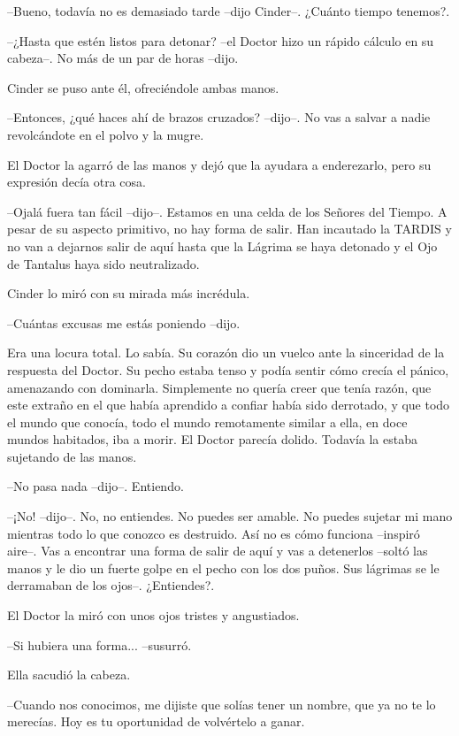 --Bueno, todavía no es demasiado tarde --dijo Cinder--. ¿Cuánto tiempo tenemos?.

--¿Hasta que estén listos para detonar? --el Doctor hizo un rápido cálculo en su cabeza--. No más de un par de horas --dijo.

Cinder se puso ante él, ofreciéndole ambas manos.

--Entonces, ¿qué haces ahí de brazos cruzados? --dijo--. No vas a salvar a nadie revolcándote en el polvo y la mugre.

El Doctor la agarró de las manos y dejó que la ayudara a enderezarlo, pero su expresión decía otra cosa.

--Ojalá fuera tan fácil --dijo--. Estamos en una celda de los Señores del Tiempo. A pesar de su aspecto primitivo, no hay forma de salir. Han incautado la TARDIS y no van a dejarnos salir de aquí hasta que la Lágrima se haya detonado y el Ojo de Tantalus haya sido neutralizado.

Cinder lo miró con su mirada más incrédula.

--Cuántas excusas me estás poniendo --dijo.

Era una locura total. Lo sabía. Su corazón dio un vuelco ante la sinceridad de la respuesta del Doctor. Su pecho estaba tenso y podía sentir cómo crecía el pánico, amenazando con dominarla. Simplemente no quería creer que tenía razón, que este extraño en el que había aprendido a confiar había sido derrotado, y que todo el mundo que conocía, todo el mundo remotamente similar a ella, en doce mundos habitados, iba a morir. El Doctor parecía dolido. Todavía la estaba sujetando de las manos.

--No pasa nada --dijo--. Entiendo.

--¡No! --dijo--. No, no entiendes. No puedes ser amable. No puedes sujetar mi mano mientras todo lo que conozco es destruido. Así no es cómo funciona --inspiró aire--. Vas a encontrar una forma de salir de aquí y vas a detenerlos --soltó las manos y le dio un fuerte golpe en el pecho con los dos puños. Sus lágrimas se le derramaban de los ojos--. ¿Entiendes?.

El Doctor la miró con unos ojos tristes y angustiados.

--Si hubiera una forma... --susurró.

Ella sacudió la cabeza.

--Cuando nos conocimos, me dijiste que solías tener un nombre, que ya no te lo merecías. Hoy es tu oportunidad de volvértelo a ganar.


